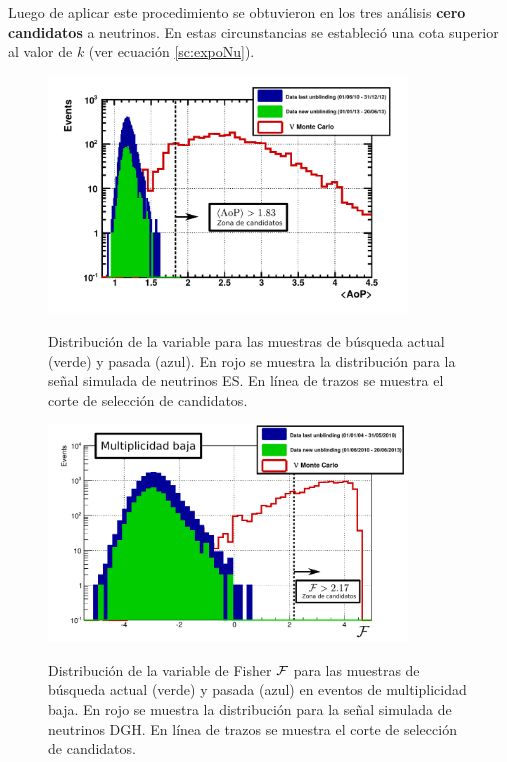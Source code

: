 	Luego de aplicar este procedimiento se obtuvieron en los tres an\'alisis \textbf{cero candidatos} a neutrinos.
	En estas circunstancias se estableci\'o una cota superior al valor de $k$ (ver ecuaci\'on \ref{sc:expoNu}).
	\begin{figure}[ht!]
		\begin{center}
			\includegraphics[width=0.85\textwidth]{fig/resultadosAuger/Unblinding_ES_200613_mod}\\
			\caption{\label{fig:unblindingES}
			Distribuci\'on de la variable \aop{} para las muestras de b\'usqueda actual (verde) y pasada (azul). En rojo se muestra la distribuci\'on para la se\~nal simulada de neutrinos ES.
			En l\'inea de trazos se muestra el corte de selecci\'on de candidatos.
			}
		\end{center}
	\end{figure}
	\begin{figure}[ht!]
		\begin{center}
			\includegraphics[width=0.85\textwidth]{fig/resultadosAuger/DGH_Retrining_May2012_2_low_Nor_mod}\\
			\caption{\label{fig:unblindingDGHL}
			Distribuci\'on de la variable de Fisher $\cal F$ para las muestras de b\'usqueda actual (verde) y pasada (azul) en eventos de multiplicidad baja. En rojo se muestra la distribuci\'on para la se\~nal simulada de neutrinos DGH.
			En l\'inea de trazos se muestra el corte de selecci\'on de candidatos.
			}
		\end{center}
	\end{figure}

